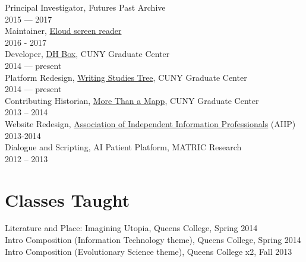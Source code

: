 \documentclass[11pt]{article}
\begin{document}
Principal Investigator, Futures Past Archive\\
2015 — 2017\\

Maintainer, \href{https://github.com/smythp/eloud}{Eloud screen reader}\\
2016 - 2017\\

Developer, \href{http://dhbox.org/}{DH Box}, CUNY Graduate Center\\
2014 — present\\

Platform Redesign, \href{http://www.writingstudiestree.org/}{Writing Studies Tree}, CUNY Graduate Center\\
2014 — present\\

Contributing Historian, \href{http://www.morethanamapp.org/}{More Than a Mapp}, CUNY Graduate Center\\
2013 – 2014\\

Website Redesign, \href{http://www.aiip.org/}{Association of Independent Information Professionals} (AIIP)\\
2013-2014\\

Dialogue and Scripting, AI Patient Platform, MATRIC Research\\
2012 – 2013\\

\section*{Classes Taught}
\label{sec:orgheadline9}

Literature and Place: Imagining Utopia, Queens College, Spring 2014\\
Intro Composition (Information Technology theme), Queens College, Spring 2014\\
Intro Composition (Evolutionary Science theme), Queens College  x2, Fall 2013\\
\end{document}
